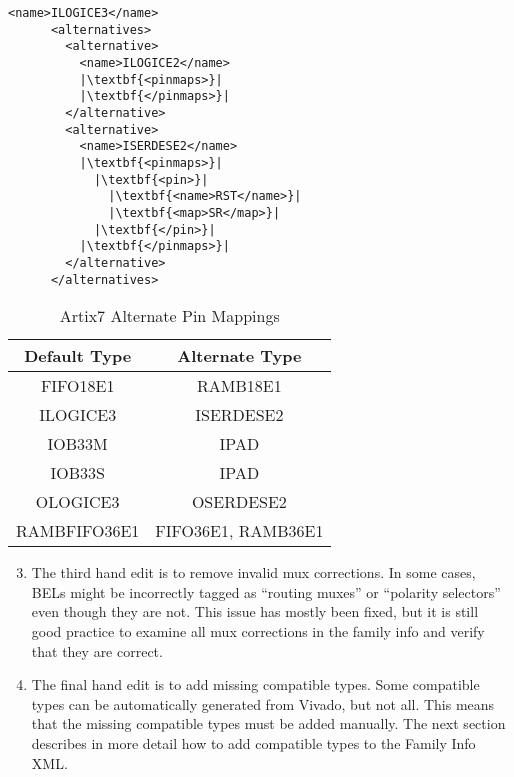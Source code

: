 \begin{lstlisting}[numbers=none, caption=Sample pinmaps in a family info file,
label=lst:apdxAPinmaps] 
      <name>ILOGICE3</name>
      <alternatives>
        <alternative>
          <name>ILOGICE2</name>
          |\textbf{<pinmaps>}|
          |\textbf{</pinmaps>}|
        </alternative>
        <alternative>
          <name>ISERDESE2</name>
          |\textbf{<pinmaps>}|
	        |\textbf{<pin>}|
	          |\textbf{<name>RST</name>}|
	          |\textbf{<map>SR</map>}|
	        |\textbf{</pin>}|
          |\textbf{</pinmaps>}|
        </alternative>
      </alternatives>
\end{lstlisting}
	  
\begin{table} [h!]
    \caption{Artix7 Alternate Pin Mappings}
	\begin{center}
	\begin{tabu}{ |c|c| }
	\hline
	\textbf{Default Type} & \textbf{Alternate Type} \\
	\hline
	\hline 
	FIFO18E1 & RAMB18E1 \\
	\hline
	ILOGICE3 & ISERDESE2 \\
	\hline
	IOB33M & IPAD \\
	\hline
	IOB33S & IPAD \\
	\hline
	OLOGICE3 & OSERDESE2 \\
	\hline
	RAMBFIFO36E1 & FIFO36E1, RAMB36E1 \\
	\hline
	\end{tabu}
	\label{tab:artix7PinMaps}
	\end{center}
\end{table}

\begin{enumerate}
\setcounter{enumi}{2}   	  	  	  
	  \item The third hand edit is to remove invalid mux corrections. In some
	  cases, BELs might be incorrectly tagged as ``routing muxes'' or ``polarity
	  selectors'' even though they are not. This issue has mostly been fixed, but
	  it is still good practice to examine all mux corrections in the
	  family info and verify that they are correct.
	  
	  \item The final hand edit is to add missing compatible types. Some compatible
	  types can be automatically generated from Vivado, but not all. This means
	  that the missing compatible types must be added manually. The next section
	  describes in more detail how to add compatible types to the Family Info XML.
\end{enumerate}

